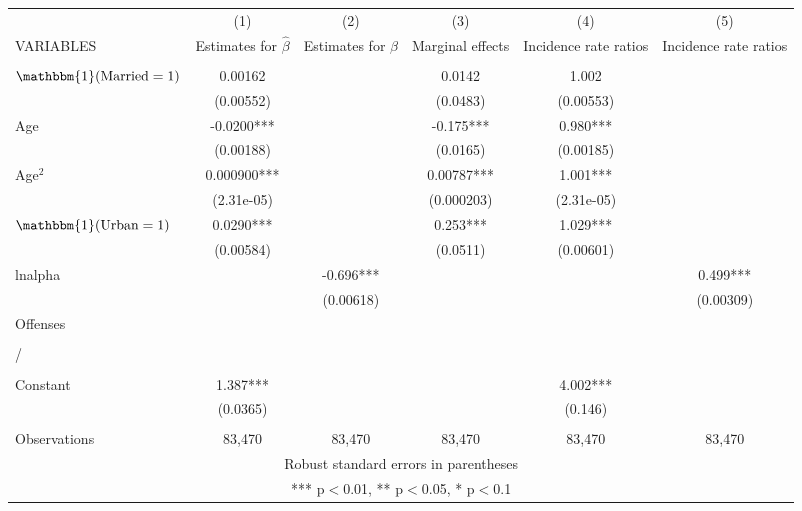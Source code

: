 \documentclass[]{article}
\begin{document}
\begin{tabular}{lccccc} \hline
 & (1) & (2) & (3) & (4) & (5) \\
VARIABLES & Estimates for $\hat{\beta}$ & Estimates for $\hat{\beta}$ & Marginal effects & Incidence rate ratios & Incidence rate ratios \\ \hline
 &  &  &  &  &  \\
$\mathbbm{1}(\text{Married}=1)$ & 0.00162 &  & 0.0142 & 1.002 &  \\
 & (0.00552) &  & (0.0483) & (0.00553) &  \\
Age & -0.0200*** &  & -0.175*** & 0.980*** &  \\
 & (0.00188) &  & (0.0165) & (0.00185) &  \\
Age$^2$ & 0.000900*** &  & 0.00787*** & 1.001*** &  \\
 & (2.31e-05) &  & (0.000203) & (2.31e-05) &  \\
$\mathbbm{1}(\text{Urban}=1)$ & 0.0290*** &  & 0.253*** & 1.029*** &  \\
 & (0.00584) &  & (0.0511) & (0.00601) &  \\
lnalpha &  & -0.696*** &  &  & 0.499*** \\
 &  & (0.00618) &  &  & (0.00309) \\
Offenses &  &  &  &  &  \\
 &  &  &  &  &  \\
/ &  &  &  &  &  \\
 &  &  &  &  &  \\
Constant & 1.387*** &  &  & 4.002*** &  \\
 & (0.0365) &  &  & (0.146) &  \\
 &  &  &  &  &  \\
 Observations & 83,470 & 83,470 & 83,470 & 83,470 & 83,470 \\ \hline
\multicolumn{6}{c}{ Robust standard errors in parentheses} \\
\multicolumn{6}{c}{ *** p$<$0.01, ** p$<$0.05, * p$<$0.1} \\
\end{tabular}
\end{document}
